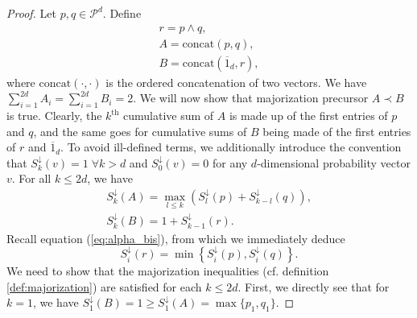 \begin{proof}
    Let $p, q \in \mathcal{P}^d$. Define 
    \begin{gather}
        r = p \wedge q,\\
        A = \text{concat}(p, q),\\
        B = \text{concat}(\overline{1}_d, r),
    \end{gather}
    where $\text{concat}(\cdot, \cdot)$ is the ordered concatenation of two vectors. We have $\sum_{i=1}^{2d} A_i = \sum_{i=1}^{2d} B_i = 2$. We will now show that majorization precursor $A \prec B$ is true. Clearly, the $k^{\text{th}}$ cumulative sum of $A$ is made up of the first entries of $p$ and $q$, and the same goes for cumulative sums of $B$ being made of the first entries of $r$ and $\overline{1}_d$. To avoid ill-defined terms, we additionally introduce the convention that $S^\downarrow_k (v) = 1 \; \forall k > d$ and $S^\downarrow_0(v) = 0$ for any $d$-dimensional probability vector $v$. For all $k \leq 2d$, we have
    \begin{gather}
        S^\downarrow_k (A) = \max_{l\leq k} \left(S^\downarrow_l (p) + S^\downarrow_{k-l} (q)\right), \\
        S^\downarrow_k (B) = 1 + S^\downarrow_{k-1}(r).
    \end{gather} %
    Recall equation (\ref{eq:alpha_bis}), from which we immediately deduce
    \begin{equation}
        S^\downarrow_i (r) = \min \left\{S^\downarrow_i (p), S^\downarrow_i (q)\right\}.
    \end{equation}
    We need to show that the majorization inequalities (cf. definition \ref{def:majorization}) are satisfied for each $k \leq 2d$. First, we directly see that for $k = 1$, we have $S^\downarrow_1(B) = 1 \geq S^\downarrow_1(A) = \max \{p_1, q_1\}$. 
    

\end{proof}
